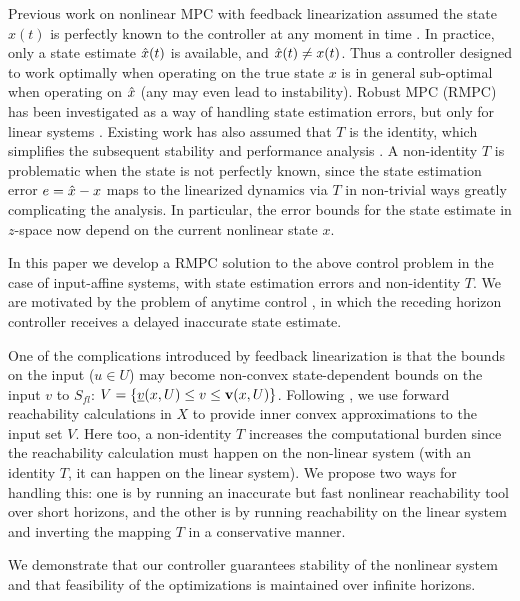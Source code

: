 Previous work on nonlinear MPC with feedback linearization assumed the state $x(t)$ is perfectly known to the controller at any moment in time \cite{SimonLG13_MPC}.
In practice, only a state estimate $\hat{x}(t)$ is available, and $\hat{x}(t) \neq x(t)$.
Thus a controller designed to work optimally when operating on the true state $x$ is in general sub-optimal when operating on $\hat{x}$ (any may even lead to instability).
Robust MPC (RMPC) has been investigated as a way of handling state estimation errors, but only for linear systems \cite{RichardsH05_RMPC}.
Existing work has also assumed that $T$ is the identity, which simplifies the subsequent stability and performance analysis \cite{SimonLG13_MPC}. 
A non-identity $T$ is problematic when the state is not perfectly known, since the state estimation error $e = \hat{x}-x$ maps to the linearized dynamics via $T$ in non-trivial ways greatly complicating the analysis.
In particular, the error bounds for the state estimate in $z$-space now depend on the current nonlinear state $x$.

In this paper we develop a RMPC solution to the above control problem in the case of input-affine systems, with state estimation errors and non-identity $T$.
We are motivated by the problem of anytime control \cite{PantAMNDM15_Anytime}, in which the receding horizon controller receives a delayed inaccurate state estimate.

One of the complications introduced by feedback linearization is that the bounds on the input ($u \in U$) may become non-convex state-dependent bounds on the input $v$ to $S_{fl}$: 
$V = \{\underline{v}(x, U) \leq v \leq \mathbf{v}(x,U)\}$.
Following \cite{SimonLG13_MPC}, we use forward reachability calculations in $X$ to provide inner convex approximations to the input set $V$.
Here too, a non-identity $T$ increases the computational burden since the reachability calculation must happen on the non-linear system (with an identity $T$, it can happen on the linear system).
We propose two ways for handling this: one is by running an inaccurate but fast nonlinear reachability tool over short horizons, and the other is by running reachability on the linear system and inverting the mapping $T$ in a conservative manner.

We demonstrate that our controller guarantees stability of the nonlinear system and that feasibility of the optimizations is maintained over infinite horizons.